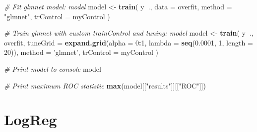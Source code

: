 \documentclass[]{book}
\newenvironment{Shaded}{\begin{snugshade}}{\end{snugshade}}
\newcommand{\KeywordTok}[1]{\textcolor[rgb]{0.13,0.29,0.53}{\textbf{#1}}}
\newcommand{\DataTypeTok}[1]{\textcolor[rgb]{0.13,0.29,0.53}{#1}}
\newcommand{\DecValTok}[1]{\textcolor[rgb]{0.00,0.00,0.81}{#1}}
\newcommand{\FloatTok}[1]{\textcolor[rgb]{0.00,0.00,0.81}{#1}}
\newcommand{\StringTok}[1]{\textcolor[rgb]{0.31,0.60,0.02}{#1}}
\newcommand{\CommentTok}[1]{\textcolor[rgb]{0.56,0.35,0.01}{\textit{#1}}}
\newcommand{\OperatorTok}[1]{\textcolor[rgb]{0.81,0.36,0.00}{\textbf{#1}}}
\newcommand{\NormalTok}[1]{#1}
\theoremstyle{definition}
\theoremstyle{definition}
\theoremstyle{definition}
\theoremstyle{remark}
\begin{document}
\begin{Shaded}
\begin{Highlighting}[]
\CommentTok{# Fit glmnet model: model}
\NormalTok{model <-}\StringTok{ }\KeywordTok{train}\NormalTok{(}
\NormalTok{  y}\OperatorTok{~}\NormalTok{., }\DataTypeTok{data =}\NormalTok{ overfit,}
  \DataTypeTok{method =} \StringTok{"glmnet"}\NormalTok{,}
  \DataTypeTok{trControl =}\NormalTok{ myControl}
\NormalTok{)}

\CommentTok{# Train glmnet with custom trainControl and tuning: model}
\NormalTok{model <-}\StringTok{ }\KeywordTok{train}\NormalTok{(}
\NormalTok{  y}\OperatorTok{~}\NormalTok{., overfit,}
  \DataTypeTok{tuneGrid =} \KeywordTok{expand.grid}\NormalTok{(}\DataTypeTok{alpha =} \DecValTok{0}\OperatorTok{:}\DecValTok{1}\NormalTok{, }\DataTypeTok{lambda =} \KeywordTok{seq}\NormalTok{(}\FloatTok{0.0001}\NormalTok{, }\DecValTok{1}\NormalTok{, }\DataTypeTok{length =} \DecValTok{20}\NormalTok{)),}
  \DataTypeTok{method =} \StringTok{'glmnet'}\NormalTok{,}
  \DataTypeTok{trControl =}\NormalTok{ myControl}
\NormalTok{)}

\CommentTok{# Print model to console}
\NormalTok{model}

\CommentTok{# Print maximum ROC statistic}
\KeywordTok{max}\NormalTok{(model[[}\StringTok{"results"}\NormalTok{]][[}\StringTok{"ROC"}\NormalTok{]])}
\end{Highlighting}
\end{Shaded}

\section{LogReg}\label{logreg}

\begin{Shaded}
\end{Shaded}
\end{document}

